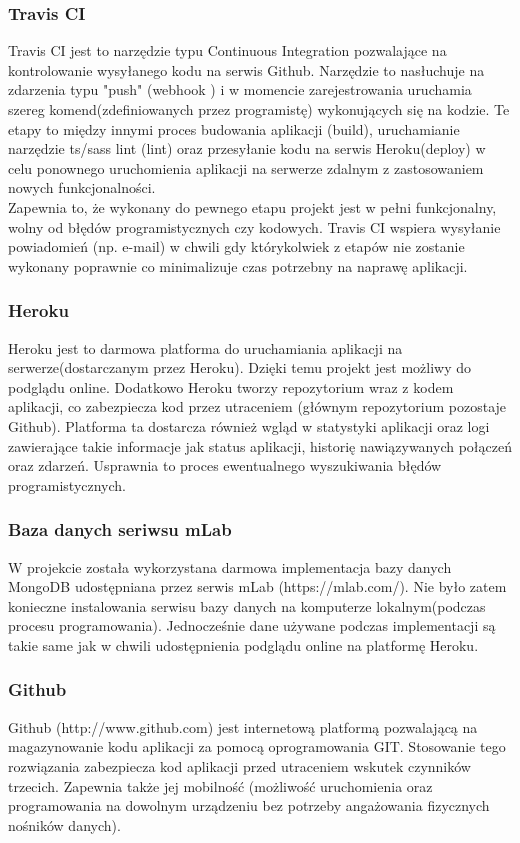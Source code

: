 \documentclass[eng,printmode]{mgr}
\begin{document}
\subsubsection{Travis CI}
Travis CI \cite{TravisCI} jest to narzędzie typu Continuous Integration \cite{Keyword_CI} pozwalające na kontrolowanie wysyłanego kodu na serwis Github. Narzędzie to nasłuchuje na zdarzenia typu "push" (webhook \cite{Keyword_Webhook}) i w momencie zarejestrowania uruchamia szereg komend(zdefiniowanych przez programistę) wykonujących się na kodzie. Te etapy to między innymi proces budowania aplikacji (build), uruchamianie narzędzie ts/sass lint (lint) oraz przesyłanie kodu na serwis Heroku(deploy) w celu ponownego uruchomienia aplikacji na serwerze zdalnym z zastosowaniem nowych funkcjonalności. \\
Zapewnia to, że wykonany do pewnego etapu projekt jest w pełni funkcjonalny, wolny od błędów programistycznych czy kodowych. Travis CI wspiera wysyłanie powiadomień (np. e-mail) w chwili gdy którykolwiek z etapów nie zostanie wykonany poprawnie co minimalizuje czas potrzebny na naprawę aplikacji.

\subsubsection{Heroku}
Heroku \cite{Heroku} jest to darmowa platforma do uruchamiania aplikacji na serwerze(dostarczanym przez Heroku). Dzięki temu projekt jest możliwy do podglądu online. Dodatkowo Heroku tworzy repozytorium wraz z kodem aplikacji, co zabezpiecza kod przez utraceniem (głównym repozytorium pozostaje Github). Platforma ta dostarcza również wgląd w statystyki aplikacji oraz logi zawierające takie informacje jak status aplikacji, historię nawiązywanych połączeń oraz zdarzeń. Usprawnia to proces ewentualnego wyszukiwania błędów programistycznych.

\subsubsection{Baza danych seriwsu mLab}
W projekcie została wykorzystana darmowa implementacja bazy danych MongoDB udostępniana przez serwis mLab (https://mlab.com/). Nie było zatem konieczne instalowania serwisu bazy danych na komputerze lokalnym(podczas procesu programowania). Jednocześnie dane używane podczas implementacji są takie same jak w chwili udostępnienia podglądu online na platformę Heroku.

\subsubsection{Github}
Github (http://www.github.com) jest internetową platformą pozwalającą na magazynowanie kodu aplikacji za pomocą oprogramowania GIT. Stosowanie tego rozwiązania zabezpiecza kod aplikacji przed utraceniem wskutek czynników trzecich. Zapewnia także jej mobilność (możliwość uruchomienia oraz programowania na dowolnym urządzeniu bez potrzeby angażowania fizycznych nośników danych).
\\
\\
\end{document}
